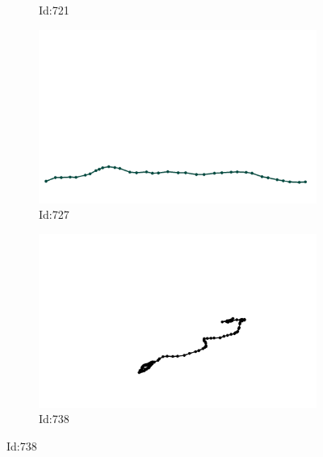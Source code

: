 \documentclass[12pt,twoside]{report}
\begin{document}
\begin{figure}
\begin{subfigure}[b]{0.20\textwidth}
\caption{Id:721}
\end{subfigure}
\begin{subfigure}[b]{0.20\textwidth}
\centering
\includegraphics[width=\textwidth]{../trajectories/727.png}
\caption{Id:727}
\end{subfigure}
\begin{subfigure}[b]{0.20\textwidth}
\centering
\includegraphics[width=\textwidth]{../trajectories/738.png}
\caption{Id:738}
\end{subfigure}
\end{figure}
\end{document}
